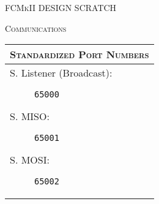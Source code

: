 \documentclass{article}
\begin{document}
{\noindent \Large \textsc{FCMkII DESIGN SCRATCH}}
\vspace{1em}

{\par\noindent\large\textsc{Communications}}

\small

\renewcommand{\arraystretch}{1.5}
{
\begin{center}
\begin{longtable}{|p{}|}
	\hline
	\textsc{Standardized Port Numbers}\\
	\hline
	\begin{description}
		\item[S. Listener (Broadcast):]\texttt{65000}
		\item[S. MISO: ]\texttt{65001}
		\item[S. MOSI: ]\texttt{65002}
	\end{description}\\
	\hline
\end{longtable}
\end{center}
}
\end{document}
